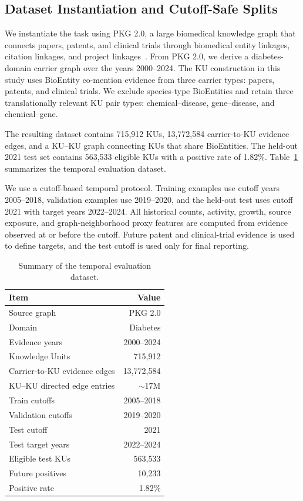 \documentclass[conference]{IEEEtran}
\begin{document}
\subsection{Dataset Instantiation and Cutoff-Safe Splits}

We instantiate the task using PKG 2.0, a large biomedical knowledge graph that connects papers, patents, and clinical trials through biomedical entity linkages, citation linkages, and project linkages~\cite{xu2024pubmed}. From PKG 2.0, we derive a diabetes-domain carrier graph over the years 2000--2024. The KU construction in this study uses BioEntity co-mention evidence from three carrier types: papers, patents, and clinical trials. We exclude species-type BioEntities and retain three translationally relevant KU pair types: chemical--disease, gene--disease, and chemical--gene.

The resulting dataset contains 715,912 KUs, 13,772,584 carrier-to-KU evidence edges, and a KU--KU graph connecting KUs that share BioEntities. The held-out 2021 test set contains 563,533 eligible KUs with a positive rate of 1.82\%. Table~\ref{tab:data_summary} summarizes the temporal evaluation dataset.

We use a cutoff-based temporal protocol. Training examples use cutoff years 2005--2018, validation examples use 2019--2020, and the held-out test uses cutoff 2021 with target years 2022--2024. All historical counts, activity, growth, source exposure, and graph-neighborhood proxy features are computed from evidence observed at or before the cutoff. Future patent and clinical-trial evidence is used to define targets, and the test cutoff is used only for final reporting.

\begin{table}[t]
\caption{Summary of the temporal evaluation dataset.}
\label{tab:data_summary}
\centering
\small
\begin{tabular}{lr}
\hline
Item & Value \\
\hline
Source graph & PKG 2.0 \\
Domain & Diabetes \\
Evidence years & 2000--2024 \\
Knowledge Units & 715,912 \\
Carrier-to-KU evidence edges & 13,772,584 \\
KU--KU directed edge entries & $\sim$17M \\
Train cutoffs & 2005--2018 \\
Validation cutoffs & 2019--2020 \\
Test cutoff & 2021 \\
Test target years & 2022--2024 \\
Eligible test KUs & 563,533 \\
Future positives & 10,233 \\
Positive rate & 1.82\% \\
\hline
\end{tabular}
\end{table}
\end{document}
